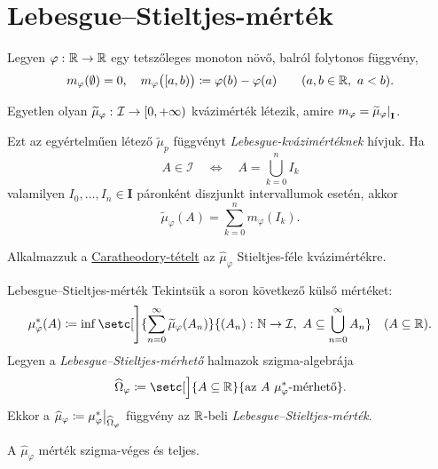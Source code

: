 \documentclass[
]{elteikthesis}[2024/04/26]
\begin{document}
	\newpage
	\section{Lebesgue--Stieltjes-mérték}
	
	Legyen \( \varphi \,\colon \mathbb{R} \to \mathbb{R} \) egy tetszőleges monoton növő, balról folytonos függvény,
	\[
		m_\varphi( \emptyset ) = 0, \quad
		m_\varphi \bigr( [a, b) \bigr) \coloneq \varphi(b) - \varphi(a) \qquad 
		(a, b \in \mathbb{R}, \ a < b).
	\]
	
	\begin{theorem}{}{}
		Egyetlen olyan
		\( \widetilde{\mu}_\varphi  \,\colon \mathcal{I} \to [0, +\infty) \) kvázimérték létezik, amire
		\( m_\varphi = \restr{ \widetilde{\mu}_\varphi }{ \mathbf{I} } \).
	\end{theorem}
	
	\vspace{3pt}
	\noindent
	Ezt az egyértelműen létező \( \widetilde{\mu}_p \) függvényt 
	\emph{Lebesgue-kvázimértéknek} hívjuk. 
	Ha
	\[
		A \in \mathcal{I}
		\quad \iff \quad
		A = \bigcup_{k=0}^{n} I_k
	\]
	valamilyen \( I_0, \dots, I_n \in \mathbf{I} \) páronként diszjunkt intervallumok esetén, akkor
	\[
		\widetilde{\mu}_\varphi(A) = \sum_{k=0}^{n} m_\varphi(I_k).
	\]
	
	\vspace{3pt}
	\noindent
	Alkalmazzuk a \hyperref[th:caratheodory]{Caratheodory-tételt}
	az \( \widehat{\mu}_\varphi \) Stieltjes-féle kvázimértékre.
	
	\begin{definition}{Lebesgue--Stieltjes-mérték}{}
		Tekintsük a soron következő külső mértéket:
		\[
			\mu_\varphi^*( A ) \coloneq
			\inf \setc[\Bigg]{ \sum_{n=0}^{\infty} \widetilde{\mu}_\varphi(A_n) }
			{ \func{(A_n)}{\N}{\mathcal{I}}, \ A \subseteq \bigcup_{n=0}^{\infty} A_n }
			\quad (A \subseteq \R).
		\]
		Legyen a \emph{Lebesgue--Stieltjes-mérhető} halmazok szigma-algebrája
		\[
		\widehat{\Omega}_\varphi \coloneq
		\setc[\Big]{ A \subseteq \R }{ \text{az } A \ \mu_\varphi^* \text{-mérhető} }.
		\]
		Ekkor a \( \widehat{ \mu }_\varphi \coloneq \restr{ \mu_\varphi^* }{ \widehat{\Omega}_\varphi } \) 
		függvény az \( \mathbb{R} \)-beli \emph{Lebesgue--Stieltjes-mérték}.
	\end{definition}
	
	\begin{note}
		A \( \widehat{ \mu }_\varphi \) mérték szigma-véges és teljes.
	\end{note}
	
\end{document}
